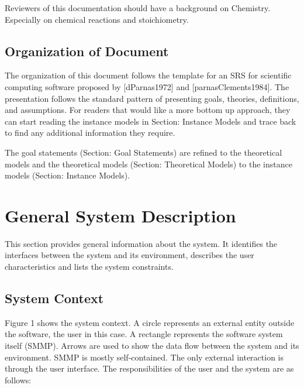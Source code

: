 \documentclass[12pt]{article}
\begin{document}
Reviewers of this documentation should have a background on
Chemistry. Especially on chemical reactions and stoichiometry.

\subsection{Organization of Document}

The organization of this document follows the template for an SRS for scientific
computing software proposed by [dParnas1972] and [parnasClements1984].   The presentation follows the standard pattern
of presenting goals, theories, definitions, and assumptions. For readers that
would like a more bottom up approach, they can start reading the instance models
in Section: Instance Models and trace back to find any additional information
they require.

The goal statements (Section: Goal Statements) are refined to the theoretical
models and the theoretical models (Section: Theoretical Models) to the instance
models (Section: Instance Models).

\section{General System Description}

This section provides general information about the system.  It identifies the
interfaces between the system and its environment, describes the user
characteristics and lists the system constraints.  

\subsection{System Context}

Figure 1 shows the system context. A circle represents an external entity
outside the software, the user in this case. A rectangle represents the software
system itself (SMMP).  Arrows are used to show the data flow between the system
and its environment.  SMMP is mostly self-contained. The only external
interaction is through the user interface. The responsibilities of the user and
the system are as follows:
\end{document}
